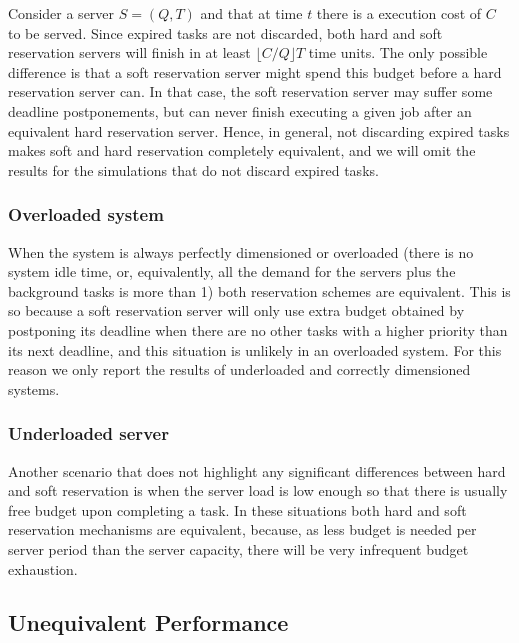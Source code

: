 \documentclass[12pt]{article}
\begin{document}
Consider a server $S = (Q,T)$ and that at time $t$ there is a
execution cost of $C$ to be served.  Since expired tasks are not
discarded, both hard and soft reservation servers will finish in at
least $\lfloor C/Q \rfloor T$ time units.  The only possible
difference is that a soft reservation server might spend this budget
before a hard reservation server can. In that case, the soft
reservation server may suffer some deadline postponements, but can
never finish executing a given job after an equivalent hard
reservation server. Hence, in general, not discarding expired tasks
makes soft and hard reservation completely equivalent, and we will
omit the results for the simulations that do not discard expired
tasks.

\subsubsection{Overloaded system}
\label{sec:system-load}

When the system is always perfectly dimensioned or overloaded (there
is no system idle time, or, equivalently, all the demand for the
servers plus the background tasks is more than 1) both reservation
schemes are equivalent. This is so because a soft reservation server
will only use extra budget obtained by postponing its deadline when
there are no other tasks with a higher priority than its next
deadline, and this situation is unlikely in an overloaded system. For
this reason we only report the results of underloaded and correctly
dimensioned systems.

\subsubsection{Underloaded server}
\label{sec:server-load}

Another scenario that does not highlight any significant differences
between hard and soft reservation is when the server load is low
enough so that there is usually free budget upon completing a task. In
these situations both hard and soft reservation mechanisms are
equivalent, because, as less budget is needed per server period than
the server capacity, there will be very infrequent budget
exhaustion.

\subsection{Unequivalent Performance}
\label{sec:indiv-simul-results}
\end{document}
